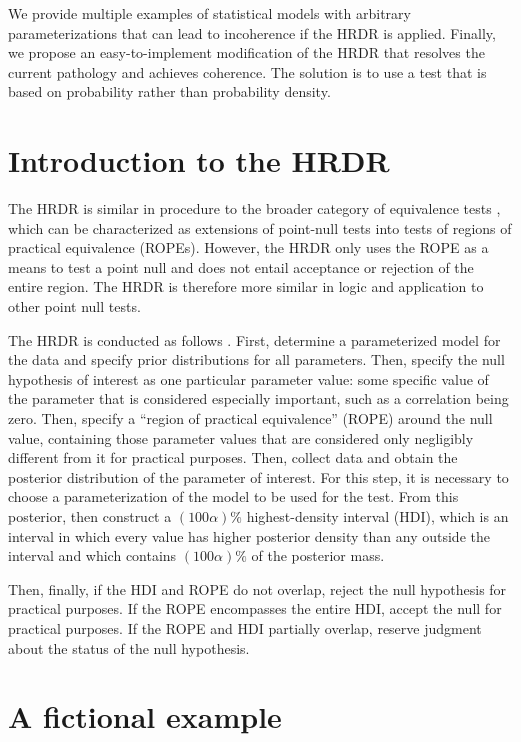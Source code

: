 \documentclass[9pt,twocolumn,twoside]{cidlab-draft}\templatetype{cidlab-invited}
\newcommand{\hdr}{HRDR}
\begin{document}
We provide multiple examples of statistical models with arbitrary parameterizations that can lead to incoherence if the \hdr{} is applied.
Finally, we propose an easy-to-implement modification of the \hdr{} that resolves the current pathology and achieves coherence. The solution is to use a test that is based on probability rather than probability density. 


\section*{Introduction to the \hdr{}}

The \hdr{} is similar in procedure to the broader category of equivalence tests \cite{Berger1996equiv,lindley1998,RogersEtAl1993}, which can be characterized as extensions of point-null tests into tests of regions of practical equivalence (ROPEs).
However, the \hdr{} only uses the ROPE as a means to test a point null and does not entail acceptance or rejection of the entire region. The \hdr{} is therefore more similar in logic and application to other point null tests.

The \hdr{} is conducted as follows \cite{Kruschke2011}.  
First, determine a parameterized model for the data and specify prior distributions for all parameters. 
Then, specify the null hypothesis of interest as one particular parameter value: some specific value of the parameter that is considered especially important, such as a correlation being zero.
Then, specify a ``region of practical equivalence'' (ROPE) around the null value, containing those parameter values that are considered only negligibly different from it for practical purposes.
Then, collect data and obtain the posterior distribution of the parameter of interest. For this step, it is necessary to choose a parameterization of the model to be used for the test. 
From this posterior, then construct a $(100\alpha)\%$ highest-density interval (HDI), which is an interval in which every value has higher posterior density than any outside the interval and which contains $(100\alpha)\%$ of the posterior mass.

Then, finally, if the HDI and ROPE do not overlap, reject the null hypothesis for practical purposes. If the ROPE encompasses the entire HDI, accept the null for practical purposes. If the ROPE and HDI partially overlap, reserve judgment about the status of the null hypothesis. 


\section*{A fictional example}
    
\end{document}
